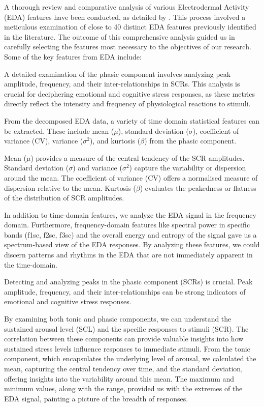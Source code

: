 A thorough review and comparative analysis of various Electrodermal Activity (EDA) features have been conducted, as detailed by \textcite{EDAFeatures}. This process involved a meticulous examination of close to 40 distinct EDA features previously identified in the literature. The outcome of this comprehensive analysis guided us in carefully selecting the features most necessary to the objectives of our research.
Some of the key features from EDA include:

A detailed examination of the phasic component involves analyzing peak amplitude, frequency, and their inter-relationships in SCRs. This analysis is crucial for deciphering emotional and cognitive stress responses, as these metrics directly reflect the intensity and frequency of physiological reactions to stimuli.

From the decomposed EDA data, a variety of time domain statistical features can be extracted. These include mean ($\mu$), standard deviation ($\sigma$), coefficient of variance (CV), variance ($\sigma^2$), and kurtosis ($\beta$) from the phasic component.

Mean ($\mu$) provides a measure of the central tendency of the SCR amplitudes.
Standard deviation ($\sigma$) and variance ($\sigma^2$) capture the variability or dispersion around the mean.
The coefficient of variance (CV) offers a normalised measure of dispersion relative to the mean.
Kurtosis ($\beta$) evaluates the peakedness or flatness of the distribution of SCR amplitudes.

In addition to time-domain features, we analyze the EDA signal in the frequency domain. Furthermore, frequency-domain features like spectral power in specific bands (f1sc, f2sc, f3sc) and the overall energy and entropy of the signal gave us a spectrum-based view of the EDA responses. By analyzing these features, we could discern patterns and rhythms in the EDA that are not immediately apparent in the time-domain.


Detecting and analyzing peaks in the phasic component (SCRs) is crucial. Peak amplitude, frequency, and their inter-relationships can be strong indicators of emotional and cognitive stress responses.

By examining both tonic and phasic components, we can understand the sustained arousal level (SCL) and the specific responses to stimuli (SCR). The correlation between these components can provide valuable insights into how sustained stress levels influence responses to immediate stimuli.
From the tonic component, which encapsulates the underlying level of arousal, we calculated the mean, capturing the central tendency over time, and the standard deviation, offering insights into the variability around this mean. The maximum and minimum values, along with the range, provided us with the extremes of the EDA signal, painting a picture of the breadth of responses.

